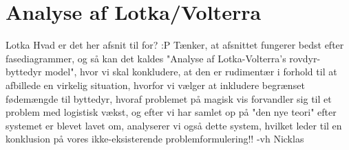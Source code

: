 \section{Analyse af Lotka/Volterra}
Lotka Hvad er det her afsnit til for? :P Tænker, at afsnittet fungerer bedst efter fasediagrammer, og så kan det kaldes "Analyse af Lotka-Volterra's rovdyr-byttedyr model", hvor vi skal konkludere, at den er rudimentær i forhold til at afbillede en virkelig situation, hvorfor vi vælger at inkludere begrænset fødemængde til byttedyr, hvoraf problemet på magisk vis forvandler sig til et problem med logistisk vækst, og efter vi har samlet op på "den nye teori" efter systemet er blevet lavet om, analyserer vi også dette system, hvilket leder til en konklusion på vores ikke-eksisterende problemformulering!!
\hfill \break
-vh Nicklas